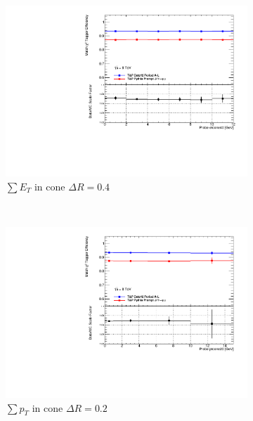 \begin{figure}[phtb]
\begin{subfigure}[b]{0.31\textwidth}
      \includegraphics[width=\textwidth]{PartCalibration2012/Plots/SFPlots/etcone40_smt.pdf}
      \caption{$\sum E_{T}$ in cone $\Delta R=0.4$}\label{fig:Alleffsfetcone40}
    \end{subfigure}
    ~
    \begin{subfigure}[b]{0.31\textwidth}
      \includegraphics[width=\textwidth]{PartCalibration2012/Plots/SFPlots/ptcone20_smt.pdf}
      \caption{$\sum p_{T}$ in cone $\Delta R=0.2$} \label{fig:Alleffsfptcone20}
    \end{subfigure}
    ~
    \begin{subfigure}[b]{0.31\textwidth}

\end{subfigure}
\end{figure}
